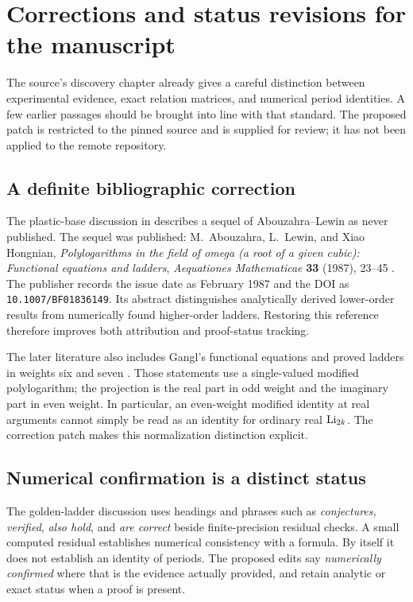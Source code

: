 \section{Corrections and status revisions for the manuscript}
\label{editorial:sec}
The source's discovery chapter already gives a careful distinction
between experimental evidence, exact relation matrices, and numerical
period identities. A few earlier passages should be brought into line
with that standard. The proposed patch is restricted to the pinned
source and is supplied for review; it has not been applied to the
remote repository.

\subsection{A definite bibliographic correction}
The plastic-base discussion in
 describes a sequel of
Abouzahra--Lewin as never published. The sequel was published:
M.~Abouzahra, L.~Lewin, and Xiao Hongnian,
\emph{Polylogarithms in the field of omega (a root of a given cubic):
Functional equations and ladders},
\emph{Aequationes Mathematicae} \textbf{33} (1987), 23--45
\cite{AbouzahraLewinXiao1987}.
The publisher records the issue date as February 1987 and the DOI as
\texttt{10.1007/BF01836149}.
Its abstract distinguishes analytically derived lower-order results
from numerically found higher-order ladders. Restoring this reference
therefore improves both attribution and proof-status tracking.

The later literature also includes Gangl's functional equations and
proved ladders in weights six and seven \cite{Gangl2013}.
Those statements use a single-valued modified polylogarithm; the
projection is the real part in odd weight and the imaginary part in
even weight. In particular, an even-weight modified identity at real
arguments cannot simply be read as an identity for ordinary real
\(\operatorname{Li}_{2k}\). The correction patch makes this normalization distinction
explicit.

\subsection{Numerical confirmation is a distinct status}
The golden-ladder discussion uses headings and phrases such as
\emph{conjectures, verified}, \emph{also hold}, and \emph{are correct}
beside finite-precision residual checks. A small computed residual
establishes numerical consistency with a formula. By itself it does
not establish an identity of periods. The proposed edits say
\emph{numerically confirmed} where that is the evidence actually
provided, and retain analytic or exact status when a proof is present.

